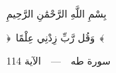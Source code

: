 \documentclass[12pt,a4paper]{article}
\begin{document}
\vspace*{\fill}
\begin{RTL}
\begin{center}
    {\arabicfont\fontsize{16}{26}\selectfont
        بِسْمِ اللَّهِ الرَّحْمَٰنِ الرَّحِيمِ}\par
    \vspace{2.2cm}
    {\arabicfont\fontsize{40}{58}\selectfont
        ﴿~وَقُل رَّبِّ زِدْنِي عِلْمًا~﴾}\par
    \vspace{2cm}
    {\arabicfont\fontsize{15}{24}\selectfont
        سورة طه\ \ —\ \ الآية 114}\par
\end{center}
\end{RTL}
\vspace*{\fill}
\end{document}

